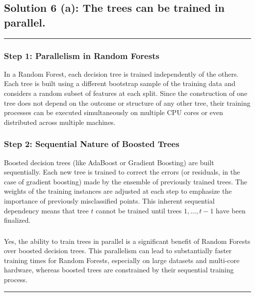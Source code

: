 \documentclass{article}
\begin{document}
\newpage

\subsection*{Solution 6 (a): The trees can be trained in parallel.}
\noindent\rule{\textwidth}{0.4pt}

\subsubsection*{Step 1: Parallelism in Random Forests}
\parbox{\textwidth}{
In a Random Forest, each decision tree is trained independently of the others. Each tree is built using a different bootstrap sample of the training data and considers a random subset of features at each split. Since the construction of one tree does not depend on the outcome or structure of any other tree, their training processes can be executed simultaneously on multiple CPU cores or even distributed across multiple machines.
}

\subsubsection*{Step 2: Sequential Nature of Boosted Trees}
\parbox{\textwidth}{
Boosted decision trees (like AdaBoost or Gradient Boosting) are built sequentially. Each new tree is trained to correct the errors (or residuals, in the case of gradient boosting) made by the ensemble of previously trained trees. The weights of the training instances are adjusted at each step to emphasize the importance of previously misclassified points. This inherent sequential dependency means that tree $t$ cannot be trained until trees $1, \ldots, t-1$ have been finalized.
}

\subsubsection*{}
\parbox{\textwidth}{
Yes, the ability to train trees in parallel is a significant benefit of Random Forests over boosted decision trees. This parallelism can lead to substantially faster training times for Random Forests, especially on large datasets and multi-core hardware, whereas boosted trees are constrained by their sequential training process.
}

\noindent\rule{\textwidth}{0.4pt}

\newpage
\end{document}
